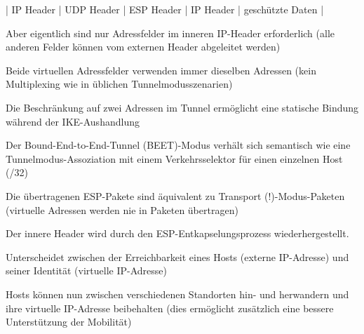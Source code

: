 \documentclass[a4paper]{article}
\begin{document}
\begin{multicols}{3}
\begin{itemize*}
\begin{itemize*}
                  \item | IP Header | UDP Header | ESP Header | IP Header | geschützte Daten |
            \end{itemize*}
            \item Aber eigentlich sind nur Adressfelder im inneren IP-Header erforderlich (alle anderen Felder können vom externen Header abgeleitet werden)
            \item Beide virtuellen Adressfelder verwenden immer dieselben Adressen (kein Multiplexing wie in üblichen Tunnelmodusszenarien)
            \item Die Beschränkung auf zwei Adressen im Tunnel ermöglicht eine statische Bindung während der IKE-Aushandlung
            \item Der Bound-End-to-End-Tunnel (BEET)-Modus verhält sich semantisch wie eine Tunnelmodus-Assoziation mit einem Verkehrsselektor für einen einzelnen Host (/32)
            \item Die übertragenen ESP-Pakete sind äquivalent zu Transport (!)-Modus-Paketen (virtuelle Adressen werden nie in Paketen übertragen)
            \item Der innere Header wird durch den ESP-Entkapselungsprozess wiederhergestellt.
            \item Unterscheidet zwischen der Erreichbarkeit eines Hosts (externe IP-Adresse) und seiner Identität (virtuelle IP-Adresse)
            \item Hosts können nun zwischen verschiedenen Standorten hin- und herwandern und ihre virtuelle IP-Adresse beibehalten (dies ermöglicht zusätzlich eine bessere Unterstützung der Mobilität)
      \end{itemize*}


\end{multicols}
\end{document}
